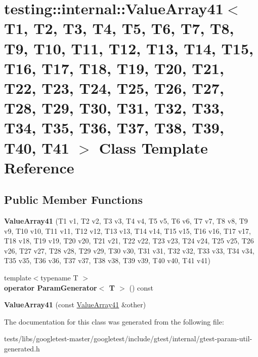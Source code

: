 \hypertarget{classtesting_1_1internal_1_1ValueArray41}{}\section{testing\+:\+:internal\+:\+:Value\+Array41$<$ T1, T2, T3, T4, T5, T6, T7, T8, T9, T10, T11, T12, T13, T14, T15, T16, T17, T18, T19, T20, T21, T22, T23, T24, T25, T26, T27, T28, T29, T30, T31, T32, T33, T34, T35, T36, T37, T38, T39, T40, T41 $>$ Class Template Reference}
\label{classtesting_1_1internal_1_1ValueArray41}
\subsection*{Public Member Functions}
\begin{DoxyCompactItemize}
\item 
\mbox{\label{classtesting_1_1internal_1_1ValueArray41_a83f8e5d2b513922000c12e549600637b}} 
{\bfseries Value\+Array41} (T1 v1, T2 v2, T3 v3, T4 v4, T5 v5, T6 v6, T7 v7, T8 v8, T9 v9, T10 v10, T11 v11, T12 v12, T13 v13, T14 v14, T15 v15, T16 v16, T17 v17, T18 v18, T19 v19, T20 v20, T21 v21, T22 v22, T23 v23, T24 v24, T25 v25, T26 v26, T27 v27, T28 v28, T29 v29, T30 v30, T31 v31, T32 v32, T33 v33, T34 v34, T35 v35, T36 v36, T37 v37, T38 v38, T39 v39, T40 v40, T41 v41)
\item 
\mbox{\label{classtesting_1_1internal_1_1ValueArray41_ad4a6f0ae2c80319295c2c2eedd1aa382}} 
{\footnotesize template$<$typename T $>$ }\\{\bfseries operator Param\+Generator$<$ T $>$} () const
\item 
\mbox{\label{classtesting_1_1internal_1_1ValueArray41_ab145f0ee0fad96b815fc3742a6c15204}} 
{\bfseries Value\+Array41} (const \hyperlink{classtesting_1_1internal_1_1ValueArray41}{Value\+Array41} \&other)
\end{DoxyCompactItemize}


The documentation for this class was generated from the following file\+:\begin{DoxyCompactItemize}
\item 
tests/libs/googletest-\/master/googletest/include/gtest/internal/gtest-\/param-\/util-\/generated.\+h\end{DoxyCompactItemize}
